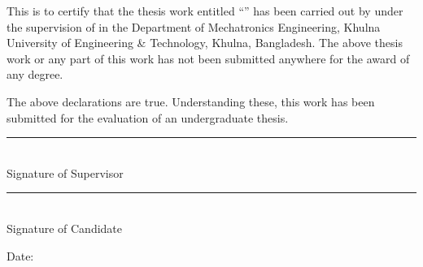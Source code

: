 
\vspace{3\baselineskip}

This is to certify that the thesis work entitled ``\thesistitle'' has been carried out by
\studentname{} under the supervision of \supervisorname{} in the Department of Mechatronics
Engineering, Khulna University of Engineering \& Technology, Khulna, Bangladesh. The above thesis
work or any part of this work has not been submitted anywhere for the award of any degree.

The above declarations are true. Understanding these, this work has been submitted for the
evaluation of an undergraduate thesis.

\vspace{4\baselineskip}

\noindent
\begin{minipage}[t]{0.48\textwidth}
\centering
\rule{0.8\linewidth}{0.4pt}\\
Signature of Supervisor
\end{minipage}\hfill
\begin{minipage}[t]{0.48\textwidth}
\centering
\rule{0.8\linewidth}{0.4pt}\\
Signature of Candidate
\end{minipage}

\vspace{2\baselineskip}

\noindent Date: \submissiondate

\clearpage
